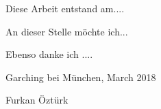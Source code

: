 \cleardoublepage
{}

Diese Arbeit entstand am....

An dieser Stelle möchte ich...

Ebenso danke ich ....

\vfill
Garching bei München, March 2018

Furkan Öztürk